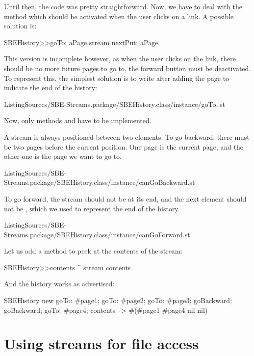 \documentclass[a4paper,10pt,twoside]{book}
\begin{document}
Until then, the code was pretty straightforward.
Now, we have to deal with the  method which should be activated when the user clicks on a link.
A possible solution is:

\begin{code}{}
SBEHistory>>goTo: aPage
		stream nextPut: aPage.
\end{code}

This version is incomplete however, as when the user clicks on the link, there should be no more future pages to go to, \ie the forward button must be deactivated.
To represent this, the simplest solution is to write  after adding the page to indicate the end of the history:

\numFiletreeMethodInput[sbehistorygoto]%
{}%
{ListingSources/SBE-Streams.package/SBEHistory.class/instance/goTo..st}

Now, only methods  and  have to be implemented.

A stream is always positioned between two elements.
To go backward, there must be two pages before the current position:
One page is the current page, and the other one is the page we want to go to.

\numFiletreeMethodInput[sbehistorycangobackward]%
{}%
{ListingSources/SBE-Streams.package/SBEHistory.class/instance/canGoBackward.st}

To go forward, the stream should not be at its end, and the next element should not be , which we used to represent the end of the history.

\numFiletreeMethodInput[sbehistorycangoforward]%
{}%
{ListingSources/SBE-Streams.package/SBEHistory.class/instance/canGoForward.st}

Let us add a method to peek at the contents of the stream:
\begin{code}{}
SBEHistory>>contents
	^ stream contents
\end{code}

And the history works as advertised:
\begin{code}{}
SBEHistory new
	goTo: #page1;
	goTo: #page2;
	goTo: #page3;
	goBackward;
	goBackward;
	goTo: #page4;
	contents --> #(#page1 #page4 nil nil)
\end{code}

\section{Using streams for file access}
\end{document}
